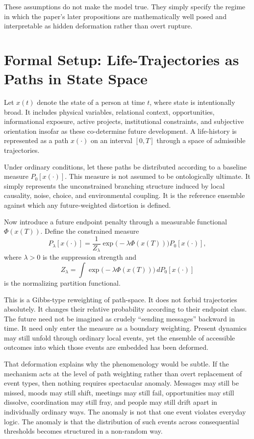 \documentclass[12pt]{article}
\begin{document}
These assumptions do not make the model true. They simply specify the regime in which the paper's later propositions are mathematically well posed and interpretable as hidden deformation rather than overt rupture.

\section{Formal Setup: Life-Trajectories as Paths in State Space}

Let $x(t)$ denote the state of a person at time $t$, where state is intentionally broad. It includes physical variables, relational context, opportunities, informational exposure, active projects, institutional constraints, and subjective orientation insofar as these co-determine future development. A life-history is represented as a path $x(\cdot)$ on an interval $[0,T]$ through a space of admissible trajectories.

Under ordinary conditions, let these paths be distributed according to a baseline measure $P_0[x(\cdot)]$. This measure is not assumed to be ontologically ultimate. It simply represents the unconstrained branching structure induced by local causality, noise, choice, and environmental coupling. It is the reference ensemble against which any future-weighted distortion is defined.

Now introduce a future endpoint penalty through a measurable functional $\Phi(x(T))$. Define the constrained measure
\[
P_\lambda[x(\cdot)] = \frac{1}{Z_\lambda} \exp\!\bigl(-\lambda \Phi(x(T))\bigr) P_0[x(\cdot)],
\]
where $\lambda > 0$ is the suppression strength and
\[
Z_\lambda = \int \exp\!\bigl(-\lambda \Phi(x(T))\bigr)\, dP_0[x(\cdot)]
\]
is the normalizing partition functional.

This is a Gibbs-type reweighting of path-space. It does not forbid trajectories absolutely. It changes their relative probability according to their endpoint class. The future need not be imagined as crudely ``sending messages'' backward in time. It need only enter the measure as a boundary weighting. Present dynamics may still unfold through ordinary local events, yet the ensemble of accessible outcomes into which those events are embedded has been deformed.

That deformation explains why the phenomenology would be subtle. If the mechanism acts at the level of path weighting rather than overt replacement of event types, then nothing requires spectacular anomaly. Messages may still be missed, moods may still shift, meetings may still fail, opportunities may still dissolve, coordination may still fray, and people may still drift apart in individually ordinary ways. The anomaly is not that one event violates everyday logic. The anomaly is that the distribution of such events across consequential thresholds becomes structured in a non-random way.
\end{document}
